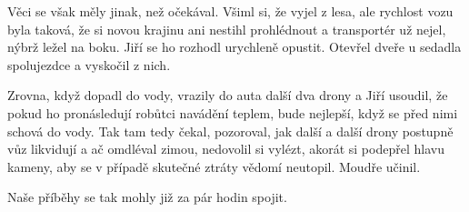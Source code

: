 Věci se však měly jinak, než očekával. Všiml si, že vyjel z lesa, ale rychlost vozu byla taková, že si novou krajinu ani nestihl prohlédnout a transportér už nejel, nýbrž ležel na boku. Jiří se ho rozhodl urychleně opustit. Otevřel dveře u sedadla spolujezdce a vyskočil z nich.

Zrovna, když dopadl do vody, vrazily do auta další dva drony a Jiří usoudil, že pokud ho pronásledují robůtci navádění teplem, bude nejlepší, když se před nimi schová do vody. Tak tam tedy čekal, pozoroval, jak další a další drony postupně vůz likvidují a ač omdléval zimou, nedovolil si vylézt, akorát si podepřel hlavu kameny, aby se v případě skutečné ztráty vědomí neutopil. Moudře učinil. 

Naše příběhy se tak mohly již za pár hodin spojit.